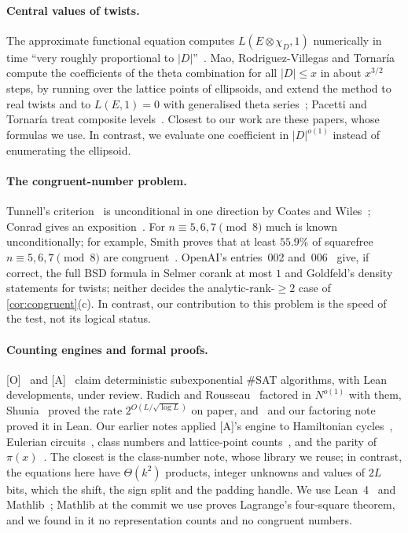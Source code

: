 \documentclass[10pt]{amsart}
\theoremstyle{plain}
\theoremstyle{definition}
\theoremstyle{remark}
\numberwithin{equation}{section}
\newcommand{\A}{\textup{[A]}}
\newcommand{\Oa}{\textup{[O]}}
\newcommand{\rate}{2^{O(L/\sqrt{\log L})}}
\newcommand{\nr}{\dag}%
\begin{document}
\paragraph{Central values of twists.} The approximate functional equation computes $L(E\otimes\chi_D,1)$
numerically in time ``very roughly proportional to $|D|$''~\cite{MRVT07}. Mao, Rodriguez-Villegas and
Tornar\'ia compute the coefficients of the theta combination for all $|D|\le x$ in about $x^{3/2}$ steps, by
running over the lattice points of ellipsoids, and extend the method to real twists and to $L(E,1)=0$ with
generalised theta series~\cite{MRVT07}; Pacetti and Tornar\'ia treat composite levels~\cite{PT08}. Closest to
our work are these papers, whose formulas we use. In contrast, we evaluate one coefficient in $|D|^{o(1)}$ instead
of enumerating the ellipsoid.

\paragraph{The congruent-number problem.} Tunnell's criterion~\cite{Tun83} is unconditional in one direction by
Coates and Wiles~\cite{CW77}\nr; Conrad gives an exposition~\cite{Con08}. For $n\equiv5,6,7\pmod8$ much is
known unconditionally; for example, Smith proves that at least $55.9\%$ of squarefree $n\equiv5,6,7\pmod8$ are
congruent~\cite{Smi16}. OpenAI's entries~002 and~006~\cite{OAI002,OAI006} give, if correct, the full BSD formula in
Selmer corank at most $1$ and Goldfeld's density statements for twists; neither decides the analytic-rank-$\ge2$
case of \cref{cor:congruent}(c). In contrast, our contribution to this problem is the speed of the test, not its
logical status.

\paragraph{Counting engines and formal proofs.} \Oa~\cite{OpenAI26} and \A~\cite{Anthropic26} claim deterministic
subexponential $\#$SAT algorithms, with Lean developments, under review. Rudich and Rousseau~\cite{RR26} factored
in $N^{o(1)}$ with them, Shunia~\cite{Shu26} proved the rate $\rate$ on paper, and~\cite{IF26} and our factoring
note~\cite{TulFac26} proved it in Lean. Our earlier notes applied \A's engine to Hamiltonian cycles~\cite{Tul26},
Eulerian circuits~\cite{TulEuler26}, class numbers and lattice-point counts~\cite{TulCN26}, and the parity of
$\pi(x)$~\cite{TulPar26}. The closest is the class-number note, whose library we reuse; in contrast, the
equations here have $\Theta(k^2)$ products, integer unknowns and values of $2L$ bits, which the shift, the sign
split and the padding handle. We use Lean~4~\cite{Lean4} and Mathlib~\cite{Mathlib20}; Mathlib at the commit we use
proves Lagrange's four-square theorem, and we found in it no representation counts and no congruent numbers.
\end{document}
